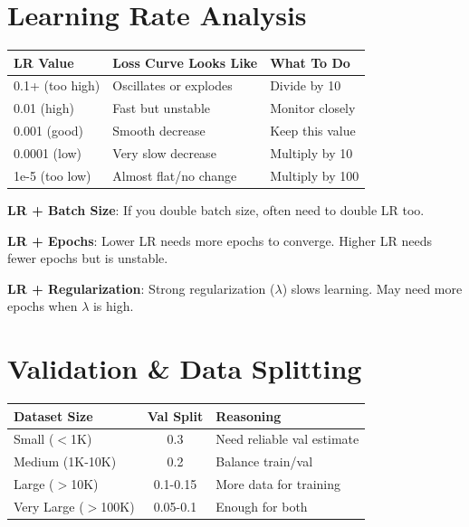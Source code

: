 \documentclass[11pt,a4paper]{article}
\begin{document}
\section{Learning Rate Analysis}

\begin{definitionbox}

\begin{tabular}{@{}l|l|l@{}}
\textbf{LR Value} & \textbf{Loss Curve Looks Like} & \textbf{What To Do} \\
\hline
0.1+ (too high) & Oscillates or explodes & Divide by 10 \\
0.01 (high) & Fast but unstable & Monitor closely \\
0.001 (good) & Smooth decrease & Keep this value \\
0.0001 (low) & Very slow decrease & Multiply by 10 \\
1e-5 (too low) & Almost flat/no change & Multiply by 100 \\
\end{tabular}
\end{definitionbox}

\begin{notebox}

\textbf{LR + Batch Size}: If you double batch size, often need to double LR too.

\textbf{LR + Epochs}: Lower LR needs more epochs to converge. Higher LR needs fewer epochs but is unstable.

\textbf{LR + Regularization}: Strong regularization ($\lambda$) slows learning. May need more epochs when $\lambda$ is high.
\end{notebox}

\section{Validation \& Data Splitting}

\begin{definitionbox}

\begin{tabular}{@{}l|c|l@{}}
\textbf{Dataset Size} & \textbf{Val Split} & \textbf{Reasoning} \\
\hline
Small ($<$1K) & 0.3 & Need reliable val estimate \\
Medium (1K-10K) & 0.2 & Balance train/val \\
Large ($>$10K) & 0.1-0.15 & More data for training \\
Very Large ($>$100K) & 0.05-0.1 & Enough for both \\
\end{tabular}
\end{definitionbox}
\end{document}
